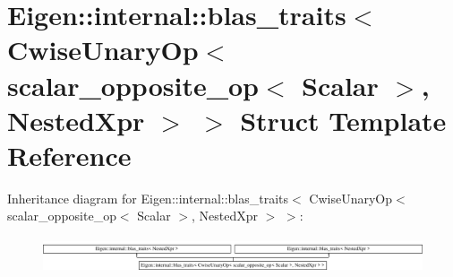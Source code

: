 \hypertarget{struct_eigen_1_1internal_1_1blas__traits_3_01_cwise_unary_op_3_01scalar__opposite__op_3_01_scalabef74274251827708a3725df034ebf7d}{}\section{Eigen\+:\+:internal\+:\+:blas\+\_\+traits$<$ Cwise\+Unary\+Op$<$ scalar\+\_\+opposite\+\_\+op$<$ Scalar $>$, Nested\+Xpr $>$ $>$ Struct Template Reference}
\label{struct_eigen_1_1internal_1_1blas__traits_3_01_cwise_unary_op_3_01scalar__opposite__op_3_01_scalabef74274251827708a3725df034ebf7d}
Inheritance diagram for Eigen\+:\+:internal\+:\+:blas\+\_\+traits$<$ Cwise\+Unary\+Op$<$ scalar\+\_\+opposite\+\_\+op$<$ Scalar $>$, Nested\+Xpr $>$ $>$\+:\begin{figure}[H]
\begin{center}
\leavevmode
\includegraphics[height=1.044776cm]{struct_eigen_1_1internal_1_1blas__traits_3_01_cwise_unary_op_3_01scalar__opposite__op_3_01_scalabef74274251827708a3725df034ebf7d}
\end{center}
\end{figure}
